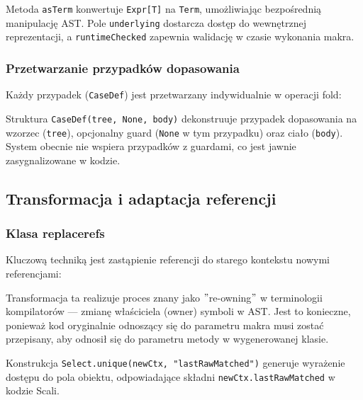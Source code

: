 Metoda \texttt{asTerm} konwertuje \texttt{Expr[T]} na \texttt{Term}, umożliwiając bezpośrednią manipulację AST. Pole \texttt{underlying} dostarcza dostęp do wewnętrznej reprezentacji, a \texttt{runtimeChecked} zapewnia walidację w czasie wykonania makra.

\subsubsection{Przetwarzanie przypadków dopasowania}\label{subsubsec:przetwarzanie-przypadkow-dopasowania}

Każdy przypadek (\texttt{CaseDef}) jest przetwarzany indywidualnie w operacji fold:



Struktura \texttt{CaseDef(tree, None, body)} dekonstruuje przypadek dopasowania na wzorzec (\texttt{tree}), opcjonalny guard (\texttt{None} w tym przypadku) oraz ciało (\texttt{body}). System obecnie nie wspiera przypadków z guardami, co jest jawnie zasygnalizowane w kodzie.

\subsection{Transformacja i adaptacja referencji}\label{subsec:transformacja-i-adaptacja-referencji}

\subsubsection{Klasa replacerefs}\label{subsubsec:klasa-replacerefs}

Kluczową techniką jest zastąpienie referencji do starego kontekstu nowymi referencjami:



Transformacja ta realizuje proces znany jako \("\)re-owning\("\) w terminologii kompilatorów — zmianę właściciela (owner) symboli w AST. Jest to konieczne, ponieważ kod oryginalnie odnoszący się do parametru makra musi zostać przepisany, aby odnosił się do parametru metody w wygenerowanej klasie.

Konstrukcja \texttt{Select.unique(newCtx, "lastRawMatched")} generuje wyrażenie dostępu do pola obiektu, odpowiadające składni \texttt{newCtx.lastRawMatched} w kodzie Scali.

